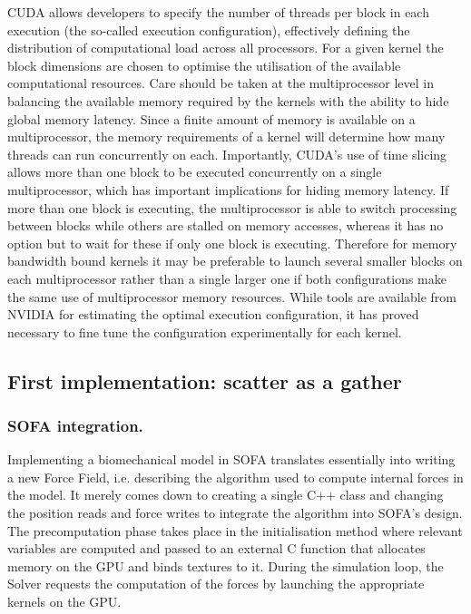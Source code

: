 CUDA allows developers to specify the number of threads per block in each execution (the so-called execution configuration), effectively defining the distribution of computational load across all processors. For a given kernel the block dimensions are chosen to optimise the utilisation of the available computational resources. Care should be taken at the multiprocessor level in balancing the available memory required by the kernels with the ability to hide global memory latency. Since a finite amount of memory is available on a multiprocessor, the memory requirements of a kernel will determine how many threads can run concurrently on each. Importantly, CUDA's use of time slicing allows more than one block to be executed concurrently on a single multiprocessor, which has important implications for hiding memory latency. If more than one block is executing, the multiprocessor is able to switch processing between blocks while others are stalled on memory accesses, whereas it has no option but to wait for these if only one block is executing. Therefore for memory bandwidth bound kernels it may be preferable to launch several smaller blocks on each multiprocessor rather than a single larger one if both configurations make the same use of multiprocessor memory resources. While tools are available from NVIDIA for estimating the optimal execution configuration, it has proved necessary to fine tune the configuration experimentally for each kernel.


	\subsection{First implementation: scatter as a gather}
	
\subsubsection*{SOFA integration.}
Implementing a biomechanical model in SOFA translates essentially into writing a new Force Field, i.e. describing the algorithm used to compute internal forces in the model. It merely comes down to creating a single C++ class and changing the position reads and force writes to integrate the algorithm into SOFA's design. The precomputation phase takes place in the initialisation method where relevant variables are computed and passed to an external C function that allocates memory on the GPU and binds textures to it. During the simulation loop, the Solver requests the computation of the forces by launching the appropriate kernels on the GPU.

